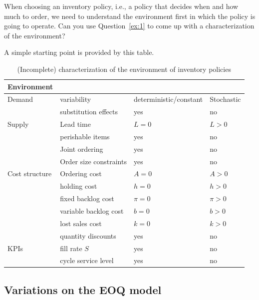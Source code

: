 
\begin{question}
  When choosing an inventory policy, i.e., a policy that decides when
  and how much to order, we need to understand the environment first
  in which the policy is going to operate. Can you use
  Question~\ref{ex:1} to come up with a characterization of the environment? 
  \begin{solution}
    A simple starting point is provided by this table.
    \begin{table}[h]
      \centering
    \begin{tabular}{l|l|l|l}
      Environment && &  \\ \hline
Demand & variability &deterministic/constant & Stochastic \\ 
& substitution effects & yes & no \\
\hline Supply & Lead time & $L=0$& $L>0$ \\ 
& perishable items & yes & no\\
& Joint ordering & yes & no\\
& Order size constraints &yes & no \\
\hline Cost structure &Ordering cost & $A=0$ & $A>0$ \\ 
& holding cost & $h=0$ &$h>0$ \\
& fixed backlog cost & $\pi=0$ &$\pi>0$\\
&variable backlog cost & $b=0$ &$b>0$\\
&lost sales cost &$k=0$ & $k>0$ \\
&quantity discounts &yes & no \\
\hline KPIs &fill rate $S$ & yes & no\\ 
& cycle service level &yes& no\\
    \end{tabular}
    \caption{(Incomplete) characterization of the environment of inventory policies}
      \label{tab:environment}
    \end{table}
  \end{solution}
\end{question}

\subsection{Variations on the EOQ model}
\label{sec:variations-eoq-model}

